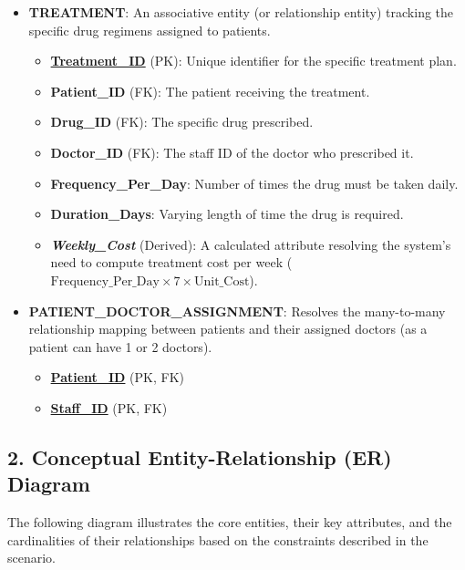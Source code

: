 \documentclass[12pt,a3paper]{article}
\begin{document}
\begin{enumerate}
\begin{tcolorbox}[enhanced,breakable,ansbox,colback=cA!4,colframe=cA,boxrule=0.8pt,arc=5pt,title={\textbf{Answer}},fonttitle=\bfseries\color{white},colbacktitle=cA]
\begin{itemize}[leftmargin=2em, itemsep=1em]
    \item \textbf{TREATMENT}: An associative entity (or relationship entity) tracking the specific drug regimens assigned to patients.
    \begin{itemize}[label={--}, itemsep=2pt]
        \item \underline{\textbf{Treatment\_ID}} (PK): Unique identifier for the specific treatment plan.
        \item \textbf{Patient\_ID} (FK): The patient receiving the treatment.
        \item \textbf{Drug\_ID} (FK): The specific drug prescribed.
        \item \textbf{Doctor\_ID} (FK): The staff ID of the doctor who prescribed it.
        \item \textbf{Frequency\_Per\_Day}: Number of times the drug must be taken daily.
        \item \textbf{Duration\_Days}: Varying length of time the drug is required.
        \item \textit{\textbf{Weekly\_Cost}} (Derived): A calculated attribute resolving the system's need to compute treatment cost per week ($\text{Frequency\_Per\_Day} \times 7 \times \text{Unit\_Cost}$).
    \end{itemize}
    
    \item \textbf{PATIENT\_DOCTOR\_ASSIGNMENT}: Resolves the many-to-many relationship mapping between patients and their assigned doctors (as a patient can have 1 or 2 doctors).
    \begin{itemize}[label={--}, itemsep=2pt]
        \item \underline{\textbf{Patient\_ID}} (PK, FK)
        \item \underline{\textbf{Staff\_ID}} (PK, FK)
    \end{itemize}
\end{itemize}

\vspace{1.5em}
\subsection*{2. Conceptual Entity-Relationship (ER) Diagram}

The following diagram illustrates the core entities, their key attributes, and the cardinalities of their relationships based on the constraints described in the scenario.


\end{tcolorbox}
\end{enumerate}
\end{document}
